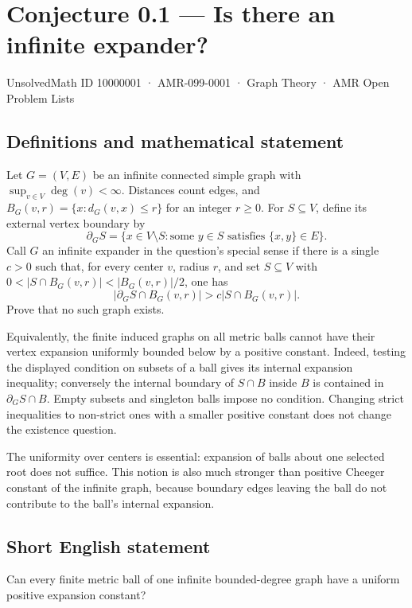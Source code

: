 \documentclass[11pt,a4paper]{article}
\begin{document}
\section*{Conjecture 0.1 — Is there an infinite expander?}\label{10000001}
{\small UnsolvedMath ID 10000001 · AMR-099-0001 · Graph Theory · AMR Open Problem Lists}
\subsection{Definitions and mathematical statement}
Let $G=(V,E)$ be an infinite connected simple graph with $\sup_{v\in V}\deg(v)<\infty$. Distances count edges, and $B_G(v,r)=\{x:d_G(v,x)\le r\}$ for an integer $r\ge0$. For $S\subseteq V$, define its external vertex boundary by
\[
\partial_G S=\{x\in V\setminus S:\text{some }y\in S\text{ satisfies }\{x,y\}\in E\}.
\]
Call $G$ an infinite expander in the question's special sense if there is a single $c>0$ such that, for every center $v$, radius $r$, and set $S\subseteq V$ with $0<|S\cap B_G(v,r)|<|B_G(v,r)|/2$, one has
\[
|\partial_G S\cap B_G(v,r)|>c|S\cap B_G(v,r)|.
\]
Prove that no such graph exists.

Equivalently, the finite induced graphs on all metric balls cannot have their vertex expansion uniformly bounded below by a positive constant. Indeed, testing the displayed condition on subsets of a ball gives its internal expansion inequality; conversely the internal boundary of $S\cap B$ inside $B$ is contained in $\partial_G S\cap B$. Empty subsets and singleton balls impose no condition. Changing strict inequalities to non-strict ones with a smaller positive constant does not change the existence question.

The uniformity over centers is essential: expansion of balls about one selected root does not suffice. This notion is also much stronger than positive Cheeger constant of the infinite graph, because boundary edges leaving the ball do not contribute to the ball's internal expansion.
\subsection{Short English statement}
Can every finite metric ball of one infinite bounded-degree graph have a uniform positive expansion constant?
\end{document}
